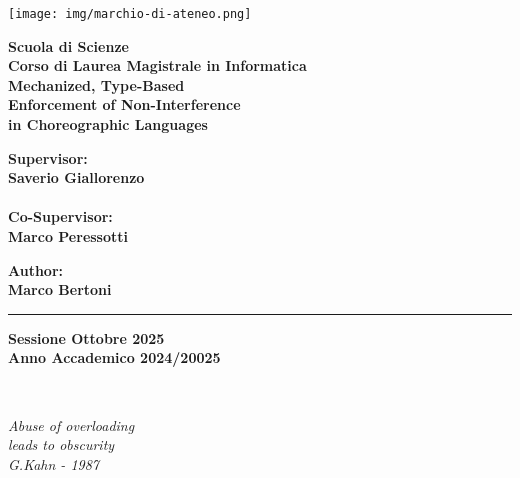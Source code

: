 \documentclass[12pt,a4paper,twoside]{book}
\begin{document}
\pagestyle{empty}

\begin{titlepage}
\begin{center}

\texttt{[image: img/marchio-di-ateneo.png]}

\vspace{10mm}
{\large{\bf{Scuola di Scienze}}}\\
\vspace{5mm}
{\Large{\bf{Corso di Laurea Magistrale in Informatica}}}\\
\vspace{15mm}
{\Huge{\bf Mechanized, Type-Based}}\\
\vspace{1mm}
{\Huge{\bf Enforcement of Non-Interference}}\\
\vspace{2mm}
{\Huge{\bf in Choreographic Languages}}\\
\end{center}
\vspace{35mm}
\begin{minipage}[t]{0.40\textwidth}
{\Large{\bf Supervisor: \\ Saverio Giallorenzo}}\\
\vspace{3mm}\\
{\Large{\bf Co-Supervisor: \\ Marco Peressotti}}
\end{minipage}
\hfill
\begin{minipage}[t]{0.40\textwidth}\raggedleft
{\Large{\bf Author: \\ Marco Bertoni}}
\end{minipage}

\vspace{35mm}
\rule[0.5cm]{15.8cm}{0.6mm}
\begin{center}
{\large{\bf Sessione Ottobre 2025\\}}
{\large{\bf Anno Accademico 2024/20025\\}}
\end{center}
\end{titlepage}
\restoregeometry

\newpage~\newpage

\topmargin=6.5cm
\begin{flushright}
\emph{
\LARGE{Abuse of overloading}\\\vspace{1mm}
\LARGE{leads to obscurity}\\\vspace{3mm} 
\LARGE{G.Kahn - 1987} 
}
\end{flushright}
\end{document}
